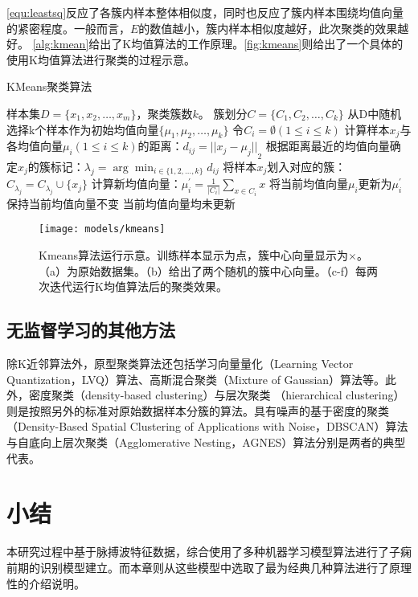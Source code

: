 \autoref{equ:leastsq}反应了各簇内样本整体相似度，同时也反应了簇内样本围绕均值向量的紧密程度。一般而言，$E$的数值越小，簇内样本相似度越好，此次聚类的效果越好。
\autoref{alg:kmean}给出了K均值算法的工作原理。\autoref{fig:kmeans}则给出了一个具体的使用K均值算法进行聚类的过程示意。
\begin{breakablealgorithm}
    \caption[KMeans聚类算法]{KMeans聚类算法\cite{Zhou2016}}
    \label{alg:kmean}
    \begin{algorithmic}[1] %
        \Require 样本集$D=\{x_1,x_2,\dots,x_m\}$，聚类簇数$k$。
        \Ensure 簇划分$C=\{C_1,C_2,\dots,C_k\}$
        \State 从D中随机选择k个样本作为初始均值向量$\{\mu_1,\mu_2,\dots,\mu_k\}$
        \Repeat
        \State 令$C_i=\emptyset (1\le i\le k)$
                \State 计算样本$x_j$与各均值向量$\mu_i (1\le i \le k)$的距离：$d_{ij}={||x_j - \mu_j||}_2$
                \State 根据距离最近的均值向量确定$x_j$的簇标记：$\lambda_j = \arg \min_{i \in \{1,2,\dots,k\}} d_{ij}$
                \State 将样本$x_j$划入对应的簇：$C_{\lambda_j} = C_{\lambda_j} \cup \{x_j\}$
            \EndFor
                \State 计算新均值向量：$\mu_i^{'}=\frac{1}{|C_i|} \sum_{x \in C_i}{x}$
                    \State 将当前均值向量$\mu_i$更新为$\mu_i^{'}$
                \Else
                    \State 保持当前均值向量不变
                \EndIf
            \EndFor
        \Until 当前均值向量均未更新
    \end{algorithmic}
\end{breakablealgorithm}
\begin{figure}[htbp]
    \centering
    \texttt{[image: models/kmeans]}
    \caption[Kmeans算法运行示意]{\label{fig:kmeans}Kmeans算法运行示意\cite{kmeans}。训练样本显示为点，簇中心向量显示为$\times$。（a）为原始数据集。（b）给出了两个随机的簇中心向量。（c-f）每两次迭代运行K均值算法后的聚类效果。}
\end{figure}

\subsection{无监督学习的其他方法}
除K近邻算法外，原型聚类算法还包括学习向量量化（Learning Vector Quantization，LVQ）算法、高斯混合聚类（Mixture of Gaussian）算法等。此外，密度聚类（density-based clustering）与层次聚类
（hierarchical clustering）则是按照另外的标准对原始数据样本分簇的算法。具有噪声的基于密度的聚类（Density-Based Spatial Clustering of Applications with Noise，DBSCAN）算法
与自底向上层次聚类（Agglomerative Nesting，AGNES）算法分别是两者的典型代表\cite{Zhou2016}。

\section{小结}
本研究过程中基于脉搏波特征数据，综合使用了多种机器学习模型算法进行了子痫前期的识别模型建立。而本章则从这些模型中选取了最为经典几种算法进行了原理性的介绍说明。
